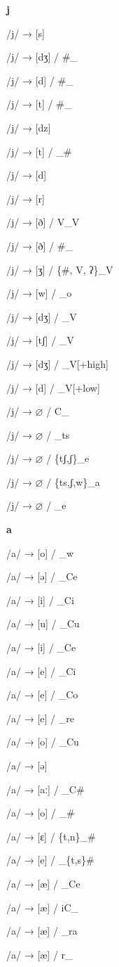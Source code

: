 \begin{center}\textbf{j}\end{center}
\begin{multicols}{4}
\noindent /j/ → [s]

\noindent /j/ → [dʒ] / \#\_

\noindent /j/ → [d] / \#\_

\noindent /j/ → [t] / \#\_

\noindent /j/ → [dz]

\noindent /j/ → [t] / \_\#

\noindent /j/ → [d]

\noindent /j/ → [r]

\noindent /j/ → [ð] / V\_V

\noindent /j/ → [ð] / \#\_

\noindent /j/ → [ʒ] / \{\#, V, ʔ\}\_V

\noindent /j/ → [w] / \_o

\noindent /j/ → [dʒ] / \_V

\noindent /j/ → [tʃ] / \_V

\noindent /j/ → [dʒ] / \_V[+high]

\noindent /j/ → [d] / \_V[+low]

\noindent /j/ → $\varnothing$ / C\_

\noindent /j/ → $\varnothing$ / \_ts

\noindent /j/ → $\varnothing$ / \{tʃ,ʃ\}\_e

\noindent /j/ → $\varnothing$ / \{ts,ʃ,w\}\_a

\noindent /j/ → $\varnothing$ / \_e
\end{multicols}

\begin{center}\textbf{a}\end{center}
\begin{multicols}{4}
\noindent /a/ → [o] / \_w

\noindent /a/ → [ə] / \_Ce

\noindent /a/ → [i] / \_Ci

\noindent /a/ → [u] / \_Cu

\noindent /a/ → [i] / \_Ce

\noindent /a/ → [e] / \_Ci

\noindent /a/ → [e] / \_Co

\noindent /a/ → [e] / \_re

\noindent /a/ → [o] / \_Cu

\noindent /a/ → [ə]

\noindent /a/ → [aː] / \_C\#

\noindent /a/ → [o] / \_\#

\noindent /a/ → [ɛ] / \{t,n\}\_\#

\noindent /a/ → [e] / \_\{t,s\}\#

\noindent /a/ → [æ] / \_Ce

\noindent /a/ → [æ] / iC\_

\noindent /a/ → [æ] / \_ra

\noindent /a/ → [æ] / r\_
\end{multicols}


